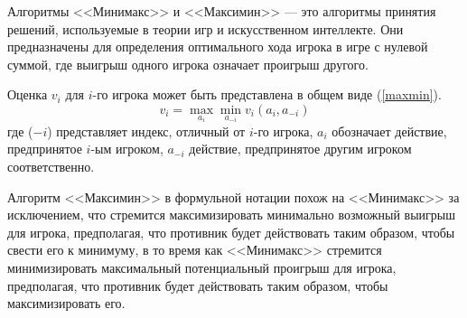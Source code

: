 Алгоритмы <<Минимакс>> и <<Максимин>> --- это алгоритмы принятия решений, используемые в теории игр и искусственном интеллекте. Они предназначены для определения оптимального хода игрока в игре с нулевой суммой, где выигрыш одного игрока означает проигрыш другого.

Оценка $v_i$ для $i$-го игрока может быть представлена в общем виде (\ref{maxmin}).
\begin{equation}\label{maxmin}
    v_i = \max_{a_i} \min_{a_{-i}} v_i(a_i, a_{-i})
\end{equation}
где ($-i$) представляет индекс, отличный от $i$-го игрока, $a_i$ обозначает действие, предпринятое $i$-ым игроком, $a_{-i}$ действие, предпринятое другим игроком соответственно.

Алгоритм <<Максимин>> в формульной нотации похож на <<Минимакс>> за исключением, что стремится максимизировать минимально возможный выигрыш для игрока, предполагая, что противник будет действовать таким образом, чтобы свести его к минимуму, в то время как <<Минимакс>> стремится минимизировать максимальный потенциальный проигрыш для игрока, предполагая, что противник будет действовать таким образом, чтобы максимизировать его.
